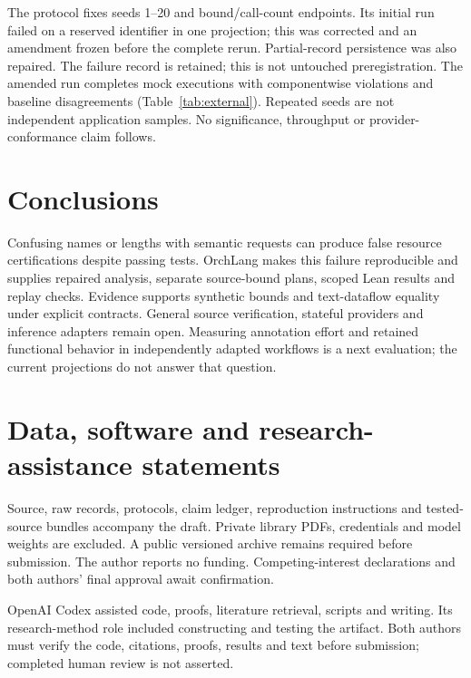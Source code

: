 \documentclass[preprint,12pt,a4paper]{elsarticle}
\begin{document}
\begin{table}[!ht]
\centering\small

\caption{External cost projections in synthetic mock units. Compiler and
structural bounds agree throughout. Changes/exclusions are in the manifest.}
\label{tab:external}
\end{table}

The protocol fixes seeds 1--20 and bound/call-count endpoints. Its initial run
failed on a reserved identifier in one projection; this was corrected and an
amendment frozen before the complete rerun. Partial-record persistence was also
repaired. The failure record is retained; this is not untouched preregistration.
The amended run completes \evExternalRuns{} mock executions with
\evExternalBoundViolations{} componentwise violations and
\evExternalBaselineDisagreements{} baseline disagreements
(Table~\ref{tab:external}). Repeated seeds are not independent application
samples. No significance, throughput or provider-conformance claim follows.

\section{Conclusions}
Confusing names or lengths with semantic requests can produce false resource
certifications despite passing tests. OrchLang makes this failure reproducible
and supplies repaired analysis, separate source-bound plans, scoped Lean results
and replay checks. Evidence supports synthetic bounds and text-dataflow equality
under explicit contracts. General source verification, stateful providers and
inference adapters remain open. Measuring annotation effort and retained
functional behavior in independently adapted workflows is a next evaluation;
the current projections do not answer that question.

\section*{Data, software and research-assistance statements}
Source, raw records, protocols, claim ledger, reproduction instructions and
tested-source bundles accompany the draft. Private library PDFs, credentials
and model weights are excluded. A public versioned archive remains required
before submission. The author reports no funding. Competing-interest
declarations and both authors' final approval await confirmation.

OpenAI Codex assisted code, proofs, literature retrieval, scripts and writing.
Its research-method role included constructing
and testing the artifact. Both authors must verify the code, citations, proofs,
results and text before submission; completed human review is not asserted.
\end{document}
